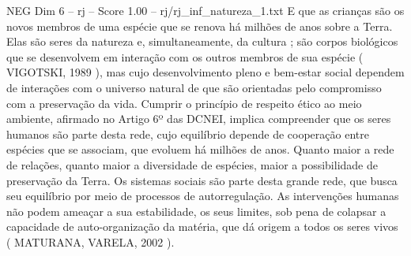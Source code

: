 \begin{textsample}{NEG Dim 6 – rj – Score 1.00 – rj/rj\_inf\_natureza\_1.txt}
E que as crianças são os novos membros de uma espécie que se renova há milhões de anos sobre a Terra.
Elas são seres da natureza e, simultaneamente, da cultura ; são corpos biológicos que se desenvolvem em interação com os outros membros de sua espécie ( VIGOTSKI, 1989 ), mas cujo desenvolvimento pleno e bem-estar social dependem de interações com o universo natural de que são orientadas pelo compromisso com a preservação da vida.
Cumprir o princípio de respeito ético ao meio ambiente, afirmado no Artigo 6º das DCNEI, implica compreender que os seres humanos são parte desta rede, cujo equilíbrio depende de cooperação entre espécies que se associam, que evoluem há milhões de anos.
Quanto maior a rede de relações, quanto maior a diversidade de espécies, maior a possibilidade de preservação da Terra.
Os sistemas sociais são parte desta grande rede, que busca seu equilíbrio por meio de processos de autorregulação.
As intervenções humanas não podem ameaçar a sua estabilidade, os seus limites, sob pena de colapsar a capacidade de auto-organização da matéria, que dá origem a todos os seres vivos ( MATURANA, VARELA, 2002 ).

\end{textsample}
